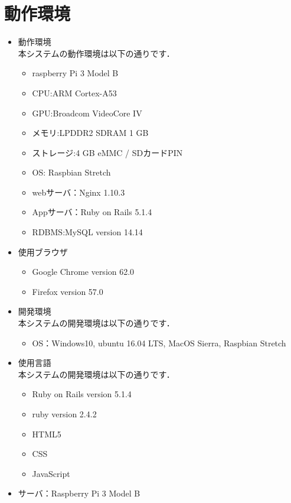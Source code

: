 \section{動作環境}

\begin{itemize}

\item 動作環境\\
本システムの動作環境は以下の通りです．
\begin{itemize}
\item raspberry Pi 3 Model B
\item CPU:ARM Cortex-A53
\item GPU:Broadcom VideoCore IV
\item メモリ:LPDDR2 SDRAM 1 GB
\item ストレージ:4 GB eMMC / SDカードPIN
\item OS: Raspbian Stretch
\item webサーバ：Nginx 1.10.3
\item Appサーバ：Ruby on Rails 5.1.4
\item RDBMS:MySQL version 14.14
\end{itemize}

\item 使用ブラウザ
  \begin{itemize}
  \item Google Chrome version 62.0
  \item Firefox version 57.0
  \end{itemize}

\item 開発環境\\
本システムの開発環境は以下の通りです．
  \begin{itemize}
  \item OS：Windows10, ubuntu 16.04 LTS, MacOS Sierra, Raspbian Stretch
  \end{itemize}

\item 使用言語\\
本システムの開発環境は以下の通りです．
\begin{itemize}
\item Ruby on Rails version 5.1.4
\item ruby version 2.4.2
\item HTML5
\item CSS
\item JavaScript
\end{itemize}

\item サーバ：Raspberry Pi 3 Model B


\end{itemize}
